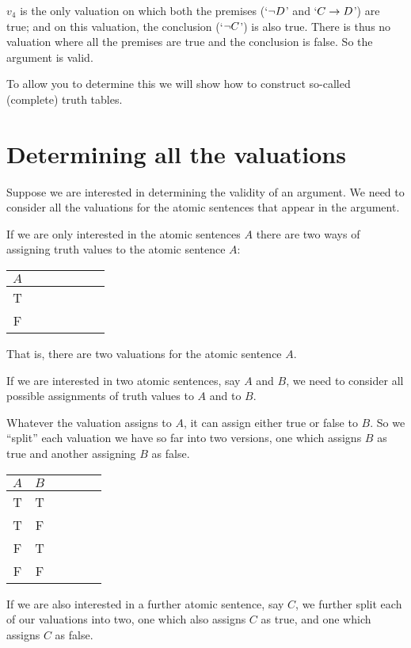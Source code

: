 $v_4$ is the only valuation on which both the premises (`$\neg D$' and `$C\rightarrow D$') are true; and on this valuation, the conclusion (`$\neg C$') is also true. 
There is thus no valuation where all the premises are true and the conclusion is false. So the argument is valid. 

To allow you to determine this we will show how to construct so-called (complete) truth tables. 
 
\section{Determining all the valuations}

Suppose we are interested in determining the validity of an argument. We need to consider all the valuations for the atomic sentences that appear in the argument. 


If we are only interested in the atomic sentences $A$ there are two ways of assigning truth values to the atomic sentence $A$:
\begin{center}
	\begin{tabular}{ccccccc}
		$A$\\\hline
		T\\
		F 
	\end{tabular}
\end{center}
That is, there are two valuations for the atomic sentence $A$. 

If we are interested in two atomic sentences, say $A$ and $B$, we need to consider all possible assignments of truth values to $A$ and to $B$. 

Whatever the valuation assigns to $A$, it can assign either true or false to $B$. So we ``split'' each valuation we have so far into two versions, one which assigns $B$ as true and another assigning $B$ as false. 

\begin{center}
	\begin{tabular}{cccccc}
		 $A$&$B$\\\hline
	T&T\\
	T&F\\
	F&T\\
	F&F
	\end{tabular}
\end{center}

If we are also interested in a further atomic sentence, say $C$, we further split each of our valuations into two, one which also assigns $C$ as true, and one which assigns $C$ as false.

